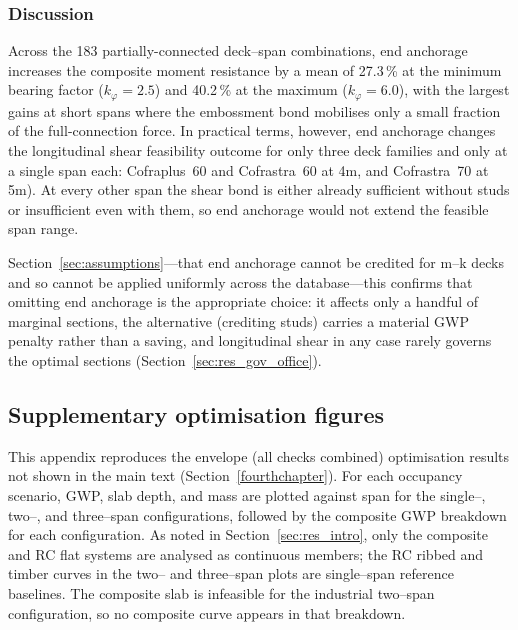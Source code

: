 \subsubsection*{Discussion}
Across the 183 partially-connected deck--span combinations, end anchorage increases the composite moment resistance by a mean of 27.3\,\% at the minimum bearing factor ($k_\varphi = 2.5$) and 40.2\,\% at the maximum ($k_\varphi = 6.0$), with the largest gains at short spans where the embossment bond mobilises only a small fraction of the full-connection force. In practical terms, however, end anchorage changes the longitudinal shear feasibility outcome for only three deck families and only at a single span each: Cofraplus~60 and Cofrastra~60 at 4m, and Cofrastra~70 at 5m). At every other span the shear bond is either already sufficient without studs or insufficient even with them, so end anchorage would not extend the feasible span range.

Section~\ref{sec:assumptions}---that end anchorage cannot be credited for m--k decks and so cannot be applied uniformly across the database---this confirms that omitting end anchorage is the appropriate choice: it affects only a handful of marginal sections, the alternative (crediting studs) carries a material GWP penalty rather than a saving, and longitudinal shear in any case rarely governs the optimal sections (Section~\ref{sec:res_gov_office}).

\subsection{Supplementary optimisation figures}
\label{app:results_figures}
This appendix reproduces the envelope (all checks combined) optimisation results not shown in the main text (Section~\ref{fourthchapter}). For each occupancy scenario, GWP, slab depth, and mass are plotted against span for the single--, two--, and three--span configurations, followed by the composite GWP breakdown for each configuration. As noted in Section~\ref{sec:res_intro}, only the composite and RC flat systems are analysed as continuous members; the RC ribbed and timber curves in the two-- and three--span plots are single--span reference baselines. The composite slab is infeasible for the industrial two--span configuration, so no composite curve appears in that breakdown.

